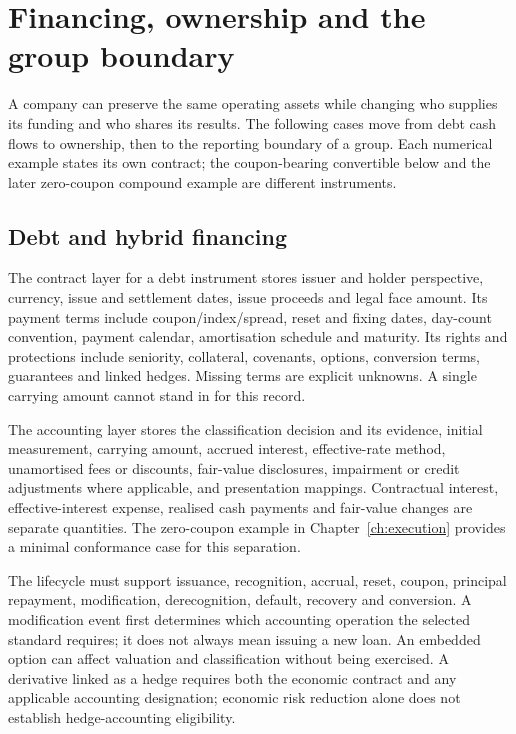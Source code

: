 \chapter{Financing, ownership and the group boundary}
\label{ch:financing-groups}

A company can preserve the same operating assets while changing who supplies
its funding and who shares its results. The following cases move from debt
cash flows to ownership, then to the reporting boundary of a group. Each
numerical example states its own contract; the coupon-bearing convertible
below and the later zero-coupon compound example are different instruments.

\section{Debt and hybrid financing}

The contract layer for a debt instrument stores issuer and holder perspective,
currency, issue and settlement dates, issue proceeds and legal face amount.
Its payment terms include coupon/index/spread, reset and fixing dates,
day-count convention, payment calendar, amortisation schedule and maturity.
Its rights and protections include seniority, collateral, covenants, options,
conversion terms, guarantees and linked hedges. Missing terms are
explicit unknowns. A single carrying amount cannot stand in for this record.

The accounting layer stores the classification decision and its evidence,
initial measurement, carrying amount, accrued interest, effective-rate method,
unamortised fees or discounts, fair-value disclosures, impairment or credit
adjustments where applicable, and presentation mappings. Contractual interest,
effective-interest expense, realised cash payments and fair-value changes are
separate quantities. The zero-coupon example in Chapter~\ref{ch:execution}
provides a minimal conformance case for this separation.

The lifecycle must support issuance, recognition, accrual, reset, coupon,
principal repayment, modification, derecognition, default, recovery and
conversion. A modification event first determines which accounting operation
the selected standard requires; it does not always mean issuing a new loan.
An embedded option can affect valuation and classification without being
exercised. A derivative linked as a hedge requires both the economic contract
and any applicable accounting designation; economic risk reduction alone does
not establish hedge-accounting eligibility.

